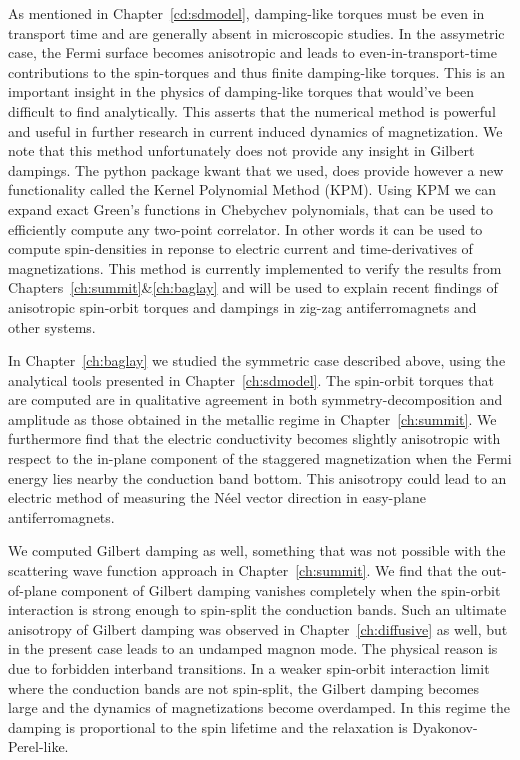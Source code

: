 As mentioned in Chapter~\ref{cd:sdmodel}, damping-like torques must be even in transport time and are generally absent in microscopic studies. In the assymetric case, the Fermi surface becomes anisotropic and leads to even-in-transport-time contributions to the spin-torques and thus finite damping-like torques. This is an important insight in the physics of damping-like torques that would've been difficult to find analytically. This asserts that the numerical method is powerful and useful in further research in current induced dynamics of magnetization. We note that this method unfortunately does not provide any insight in Gilbert dampings. The python package kwant that we used, does provide however a new functionality called the Kernel Polynomial Method (KPM). Using KPM we can expand exact Green's functions in Chebychev polynomials, that can be used to efficiently compute any two-point correlator. In other words it can be used to compute spin-densities in reponse to electric current and time-derivatives of magnetizations. This method is currently implemented to verify the results from Chapters~\ref{ch:summit}\&\ref{ch:baglay} and will be used to explain recent findings of anisotropic spin-orbit torques and dampings in zig-zag antiferromagnets and other systems.

In Chapter~\ref{ch:baglay} we studied the symmetric case described above, using the analytical tools presented in Chapter~\ref{ch:sdmodel}. The spin-orbit torques that are computed are in qualitative agreement in both symmetry-decomposition and amplitude as those obtained in the metallic regime in Chapter~\ref{ch:summit}. We furthermore find that the electric conductivity becomes slightly anisotropic with respect to the in-plane component of the staggered magnetization when the Fermi energy lies nearby the conduction band bottom. This anisotropy could lead to an electric method of measuring the N\'eel vector direction in easy-plane antiferromagnets. 

We computed Gilbert damping as well, something that was not possible with the scattering wave function approach in Chapter~\ref{ch:summit}. We find that the out-of-plane component of Gilbert damping vanishes completely when the spin-orbit interaction is strong enough to spin-split the conduction bands. Such an ultimate anisotropy of Gilbert damping was observed in Chapter~\ref{ch:diffusive} as well, but in the present case leads to an undamped magnon mode. The physical reason is due to forbidden interband transitions. In a weaker spin-orbit interaction limit where the conduction bands are not spin-split, the Gilbert damping becomes large and the dynamics of magnetizations become overdamped. In this regime the damping is proportional to the spin lifetime and the relaxation is Dyakonov-Perel-like. 

